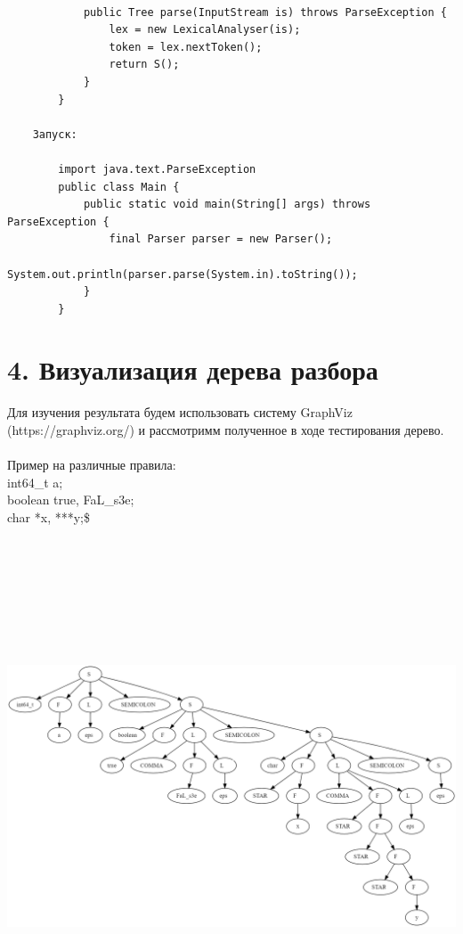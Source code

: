 \documentclass[10pt,a4paper,oneside]{article}
\begin{document}
\begin{verbatim}
        
            public Tree parse(InputStream is) throws ParseException {
                lex = new LexicalAnalyser(is);
                token = lex.nextToken();
                return S();
            }
        }
        
    Запуск:
    
        import java.text.ParseException
        public class Main {
            public static void main(String[] args) throws ParseException {
                final Parser parser = new Parser();
                System.out.println(parser.parse(System.in).toString());
            }
        }

  \end{verbatim}
  \section{4. Визуализация дерева разбора}
  \noindent
  Для изучения результата будем использовать систему GraphViz
(https://graphviz.org/) и рассмотримм полученное в ходе тестирования дерево.\\\\

Пример на различные правила: \\
int64\_t a; \\
boolean true, FaL\_s3e; \\
char *x, ***y;\$ \\

    \includegraphics[height=16cm,width=18cm]{graphviz.png}
 \noindent 
  
\end{document}
